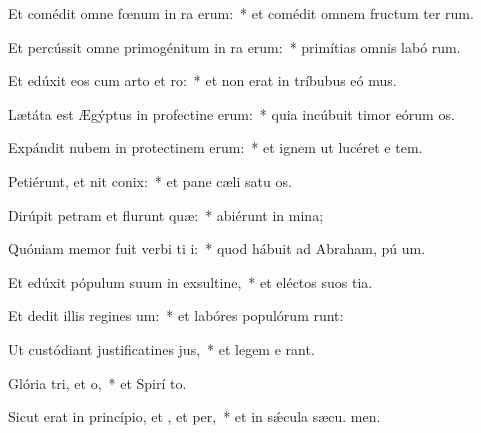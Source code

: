 \item Et comédit omne fœnum in ra erum:~* et comédit omnem fructum ter rum.
\item Et percússit omne primogénitum in ra erum:~* primítias omnis labó rum.
\item Et edúxit eos cum arto et ro:~* et non erat in tríbubus eó mus.
\item Lætáta est Ægýptus in profectine erum:~* quia incúbuit timor eórum  os.
\item Expándit nubem in protectinem erum:~* et ignem ut lucéret e  tem.
\item Petiérunt, et nit conix:~* et pane cæli satu os.
\item Dirúpit petram et flurunt quæ:~* abiérunt in  mina;
\item Quóniam memor fuit verbi ti i:~* quod hábuit ad Abraham, pú um.
\item Et edúxit pópulum suum in exsultine,~* et eléctos suos  tia.
\item Et dedit illis regines um:~* et labóres populórum runt:
\item Ut custódiant justificatines jus,~* et legem e rant.
\item Glória tri, et o,~* et Spirí to.
\item Sicut erat in princípio, et , et per,~* et in sǽcula sæcu. men.
